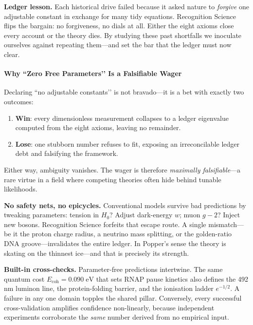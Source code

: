 \documentclass[11pt,oneside]{book}
\begin{document}
\bigskip
\noindent\textbf{Ledger lesson.}
Each historical drive failed because it asked nature to \emph{forgive}
one adjustable constant in exchange for many tidy equations.
Recognition Science flips the bargain: no forgiveness, no dials at all.
Either the eight axioms close every account or the theory dies.  By
studying these past shortfalls we inoculate ourselves against repeating
them—and set the bar that the ledger must now clear.

\paragraph{Why “Zero Free Parameters’’ Is a Falsifiable Wager}
\label{ssec:zero-param-wager}

\noindent
Declaring “no adjustable constants’’ is not bravado—it is a bet with
exactly two outcomes:

\begin{enumerate}
\item\textbf{Win}: every dimensionless measurement collapses to a ledger
      eigenvalue computed from the eight axioms, leaving no remainder.
\item\textbf{Lose}: one stubborn number refuses to fit, exposing an
      irreconcilable ledger debt and falsifying the framework.
\end{enumerate}

Either way, ambiguity vanishes.  The wager is therefore
\emph{maximally falsifiable}—a rare virtue in a field where competing
theories often hide behind tunable likelihoods.

\vspace{0.5\baselineskip}
\noindent\textbf{No safety nets, no epicycles.}
Conventional models survive bad predictions by tweaking parameters:
tension in \(H_0\)? Adjust dark-energy \(w\); muon \(g{-}2\)? Inject new
bosons.  Recognition Science forfeits that escape route.
A single mismatch—be it the proton charge radius, a neutrino mass
splitting, or the golden-ratio DNA groove—invalidates the entire
ledger.  In Popper’s sense the theory is skating on the thinnest
ice—and that is precisely its strength.

\vspace{0.5\baselineskip}
\noindent\textbf{Built-in cross-checks.}
Parameter-free predictions intertwine.  The same quantum cost
\(E_{\text{coh}}=0.090\;\mathrm{eV}\) that sets RNAP pause kinetics
also defines the 492 nm luminon line, the protein-folding barrier, and
the ionisation ladder \(e^{-1/2}\).  A failure in any one domain
topples the shared pillar.  Conversely, every successful
cross-validation amplifies confidence non-linearly, because
independent experiments corroborate the \emph{same} number derived from
no empirical input.
\end{document}
